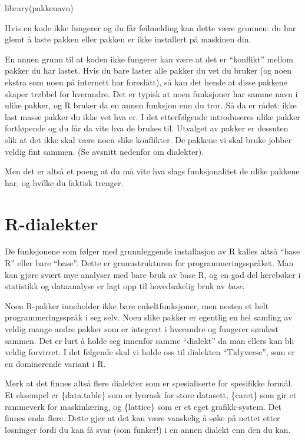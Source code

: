 \documentclass[
  letterpaper,
  DIV=11,
  numbers=noendperiod]{scrreprt}
\newenvironment{Shaded}{\begin{snugshade}}{\end{snugshade}}
\newcommand{\FunctionTok}[1]{\textcolor[rgb]{0.28,0.35,0.67}{#1}}
\newcommand{\NormalTok}[1]{\textcolor[rgb]{0.00,0.23,0.31}{#1}}
\theoremstyle{definition}
\theoremstyle{remark}
\begin{document}
\begin{Shaded}
\begin{Highlighting}[]
\FunctionTok{library}\NormalTok{(pakkenavn)}
\end{Highlighting}
\end{Shaded}

Hvis en kode ikke fungerer og du får feilmelding kan dette være grunnen:
du har glemt å laste pakken eller pakken er ikke installert på maskinen
din.

En annen grunn til at koden ikke fungerer kan være at det er
``konflikt'' mellom pakker du har lastet. Hvis du bare laster alle
pakker du vet du bruker (og noen ekstra som noen på internett har
foreslått), så kan det hende at disse pakkene skaper trøbbel for
hverandre. Det er typisk at noen funksjoner har samme navn i ulike
pakker, og R bruker da en annen funksjon enn du tror. Så da er rådet:
ikke last masse pakker du ikke vet hva er. I det etterfølgende
introduseres ulike pakker fortløpende og du får da vite hva de brukes
til. Utvalget av pakker er dessuten slik at det ikke skal være noen
slike konflikter. De pakkene vi skal bruke jobber veldig fint sammen.
(Se avsnitt nedenfor om dialekter).

Men det er altså et poeng at du må vite hva slags funksjonalitet de
ulike pakkene har, og hvilke du faktisk trenger.

\hypertarget{r-dialekter}{%
\section{R-dialekter}\label{r-dialekter}}

De funksjonene som følger med grunnleggende installasjon av R kalles
altså ``base R'' eller bare ``base''. Dette er grunnstrukturen for
programmeringsspråket. Man kan gjøre svært mye analyser med bare bruk av
base R, og en god del lærebøker i statistikk og dataanalyse er lagt opp
til hovedsakelig bruk av \emph{base}.

Noen R-pakker inneholder ikke bare enkeltfunksjoner, men nesten et helt
programmeringsspråk i seg selv. Noen slike pakker er egentlig en hel
samling av veldig mange andre pakker som er integrert i hverandre og
fungerer sømløst sammen. Det er lurt å holde seg innenfor samme
``dialekt'' da man ellers kan bli veldig forvirret. I det følgende skal
vi holde oss til dialekten ``Tidyverse'', som er en dominerende variant
i R.

Merk at det finnes altså flere dialekter som er spesialiserte for
spesifikke formål. Et eksempel er \{data.table\} som er lynrask for
store datasett, \{caret\} som gir et rammeverk for maskinlæring, og
\{lattice\} som er et eget grafikk-system. Det finnes enda flere. Dette
gjør at det kan være vanskelig å søke på nettet etter løsninger fordi du
kan få svar (som funker!) i en annen dialekt enn den du kan.
\end{document}
